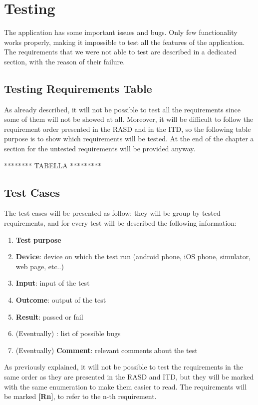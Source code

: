 \documentclass[../ATD.tex]{subfiles}
\begin{document}
    \chapter{Testing}\label{ch:testing}
    The application has some important issues and bugs.
    Only few functionality works properly, making it impossible to test all the features of the application.
    The requirements that we were not able to test are described in a dedicated section, with the reason of their failure.

    \section{Testing Requirements Table}\label{sec:testing-requirements-table}
    As already described, it will not be possible to test all the requirements since some of them will not be showed at all.
    Moreover, it will be difficult to follow the requirement order presented in the RASD and in the ITD, so the following table purpose is to show which requirements will be tested.
    At the end of the chapter a section for the untested requirements will be provided anyway.

    ******** TABELLA *********

    \section{Test Cases}\label{sec:test-cases}
    The test cases will be presented as follow: they will be group by tested requirements, and for every test will be described the following information:
    \begin{enumerate}
        \item \textbf{Test purpose}
        \item \textbf{Device}: device on which the test run (android phone, iOS phone, simulator, web page, etc..)
        \item \textbf{Input}: input of the test
        \item \textbf{Outcome}: output of the test
        \item \textbf{Result}: passed or fail
        \item (Eventually) : list of possible bugs
        \item (Eventually) \textbf{Comment}: relevant comments about the test
    \end{enumerate}
    As previously explained, it will not be possible to test the requirements in the same order as they are presented in the RASD and ITD,
    but they will be marked with the same enumeration to make them easier to read.
    The requirements will be marked \textbf{[Rn]}, to refer to the n-th requirement.
\end{document}
